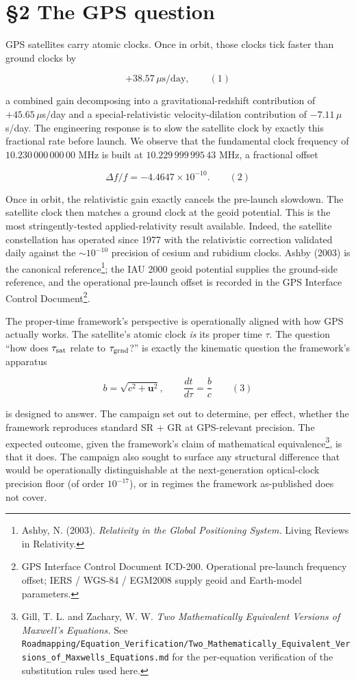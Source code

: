 \documentclass[
  11pt,
]{article}
\begin{document}
\hypertarget{the-gps-question}{%
\section{§2 The GPS question}\label{the-gps-question}}

GPS satellites carry atomic clocks. Once in orbit, those clocks tick
faster than ground clocks by

\[+38.57\,\mu\text{s/day}, \qquad (1)\]

a combined gain decomposing into a gravitational-redshift contribution
of \(+45.65\,\mu\)s/day and a special-relativistic velocity-dilation
contribution of \(-7.11\,\mu\)s/day. The engineering response is to slow
the satellite clock by exactly this fractional rate before launch. We
observe that the fundamental clock frequency of \(10.230\,000\,000\,00\)
MHz is built at \(10.229\,999\,995\,43\) MHz, a fractional offset

\[\Delta f / f = -4.4647 \times 10^{-10}. \qquad (2)\]

Once in orbit, the relativistic gain exactly cancels the pre-launch
slowdown. The satellite clock then matches a ground clock at the geoid
potential. This is the most stringently-tested applied-relativity result
available. Indeed, the satellite constellation has operated since 1977
with the relativistic correction validated daily against the
\(\sim 10^{-10}\) precision of cesium and rubidium clocks. Ashby (2003)
is the canonical reference\footnote{Ashby, N. (2003). \emph{Relativity
  in the Global Positioning System.} Living Reviews in Relativity.}; the
IAU 2000 geoid potential supplies the ground-side reference, and the
operational pre-launch offset is recorded in the GPS Interface Control
Document\footnote{GPS Interface Control Document ICD-200. Operational
  pre-launch frequency offset; IERS / WGS-84 / EGM2008 supply geoid and
  Earth-model parameters.}.

The proper-time framework's perspective is operationally aligned with
how GPS actually works. The satellite's atomic clock \emph{is} its
proper time \(\tau\). The question ``how does \(\tau_{\rm sat}\) relate
to \(\tau_{\rm grnd}\)?'' is exactly the kinematic question the
framework's apparatus

\[b = \sqrt{c^2 + \mathbf{u}^2}, \qquad \frac{dt}{d\tau} = \frac{b}{c} \qquad (3)\]

is designed to answer. The campaign set out to determine, per effect,
whether the framework reproduces standard SR + GR at GPS-relevant
precision. The expected outcome, given the framework's claim of
mathematical equivalence\footnote{Gill, T. L. and Zachary, W. W.
  \emph{Two Mathematically Equivalent Versions of Maxwell's Equations.}
  See
  \texttt{Roadmapping/Equation\_Verification/Two\_Mathematically\_Equivalent\_Versions\_of\_Maxwells\_Equations.md}
  for the per-equation verification of the substitution rules used here.},
is that it does. The campaign also sought to surface any structural
difference that would be operationally distinguishable at the
next-generation optical-clock precision floor (of order \(10^{-17}\)),
or in regimes the framework as-published does not cover.
\end{document}
